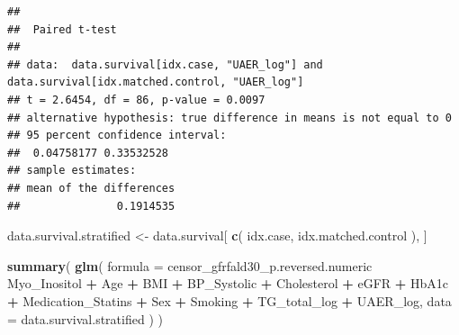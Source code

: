 \documentclass[]{article}
\newenvironment{Shaded}{\begin{snugshade}}{\end{snugshade}}
\newcommand{\DataTypeTok}[1]{\textcolor[rgb]{0.13,0.29,0.53}{#1}}
\newcommand{\KeywordTok}[1]{\textcolor[rgb]{0.13,0.29,0.53}{\textbf{#1}}}
\newcommand{\NormalTok}[1]{#1}
\newcommand{\OperatorTok}[1]{\textcolor[rgb]{0.81,0.36,0.00}{\textbf{#1}}}
\newcommand{\StringTok}[1]{\textcolor[rgb]{0.31,0.60,0.02}{#1}}
\begin{document}
\begin{verbatim}
## 
##  Paired t-test
## 
## data:  data.survival[idx.case, "UAER_log"] and data.survival[idx.matched.control, "UAER_log"]
## t = 2.6454, df = 86, p-value = 0.0097
## alternative hypothesis: true difference in means is not equal to 0
## 95 percent confidence interval:
##  0.04758177 0.33532528
## sample estimates:
## mean of the differences 
##               0.1914535
\end{verbatim}

\begin{Shaded}
\begin{Highlighting}[]
\NormalTok{data.survival.stratified <-}
\StringTok{  }\NormalTok{data.survival[ }\KeywordTok{c}\NormalTok{( idx.case, idx.matched.control ), ]}

\KeywordTok{summary}\NormalTok{(}
  \KeywordTok{glm}\NormalTok{(}
    \DataTypeTok{formula =}
\NormalTok{      censor_gfrfald30_p.reversed.numeric }\OperatorTok{~}\StringTok{ }
\StringTok{      }\NormalTok{Myo_Inositol }\OperatorTok{+}\StringTok{ }
\StringTok{      }\NormalTok{Age }\OperatorTok{+}
\StringTok{      }\NormalTok{BMI }\OperatorTok{+}\StringTok{ }
\StringTok{      }\NormalTok{BP_Systolic }\OperatorTok{+}\StringTok{ }
\StringTok{      }\NormalTok{Cholesterol }\OperatorTok{+}\StringTok{ }
\StringTok{      }\NormalTok{eGFR }\OperatorTok{+}\StringTok{ }
\StringTok{      }\NormalTok{HbA1c }\OperatorTok{+}
\StringTok{      }\NormalTok{Medication_Statins }\OperatorTok{+}
\StringTok{      }\NormalTok{Sex }\OperatorTok{+}\StringTok{  }
\StringTok{      }\NormalTok{Smoking }\OperatorTok{+}\StringTok{ }
\StringTok{      }\NormalTok{TG_total_log }\OperatorTok{+}
\StringTok{      }\NormalTok{UAER_log, }
    \DataTypeTok{data =}\NormalTok{ data.survival.stratified}
\NormalTok{  )}
\NormalTok{)}
\end{Highlighting}
\end{Shaded}
\end{document}
